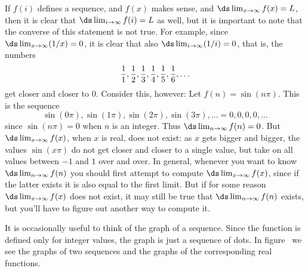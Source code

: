 If $f(i)$ defines a sequence, and $f(x)$ makes sense, and 
$\ds \lim_{x\to\infty}f(x)=L$, then it is clear that
$\ds \lim_{i\to\infty}f(i)=L$ as well, but it is important to note that
the converse of this statement is not true. For example, since
$\ds \lim_{x\to\infty}(1/x)=0$, it is clear that also
$\ds \lim_{i\to\infty}(1/i)=0$, that is, the numbers
$${1\over1},{1\over2},{1\over3},{1\over4},{1\over5},{1\over6},\ldots$$
get closer and closer to 0. Consider this, however: Let 
$f(n)=\sin(n\pi)$. This is the sequence
$$
  \sin(0\pi), \sin(1\pi),\sin(2\pi),\sin(3\pi),\ldots=0,0,0,0,\ldots
$$
since $\sin(n\pi)=0$ when $n$ is an integer. Thus
$\ds \lim_{n\to\infty}f(n)=0$. But $\ds \lim_{x\to\infty}f(x)$, when $x$ is
real, does not exist: as $x$ gets bigger and bigger, the values
$\sin(x\pi)$ do not get closer and closer to a single value, but take
on all values between $-1$ and $1$ over and over. In general, whenever
you want to know $\ds \lim_{n\to\infty}f(n)$ you should first attempt to
compute $\ds \lim_{x\to\infty}f(x)$, since if the latter exists it is also
equal to the first limit. But if for some reason
$\ds \lim_{x\to\infty}f(x)$ does not exist, it may still be true that 
$\ds \lim_{n\to\infty}f(n)$ exists, but you'll have to figure out
another way to compute it.

It is occasionally useful to think of the graph of a sequence. Since
the function is defined only for integer values, the graph is just a
sequence of dots. In figure~ we see the
graphs of two sequences and the graphs of the corresponding real
functions.

